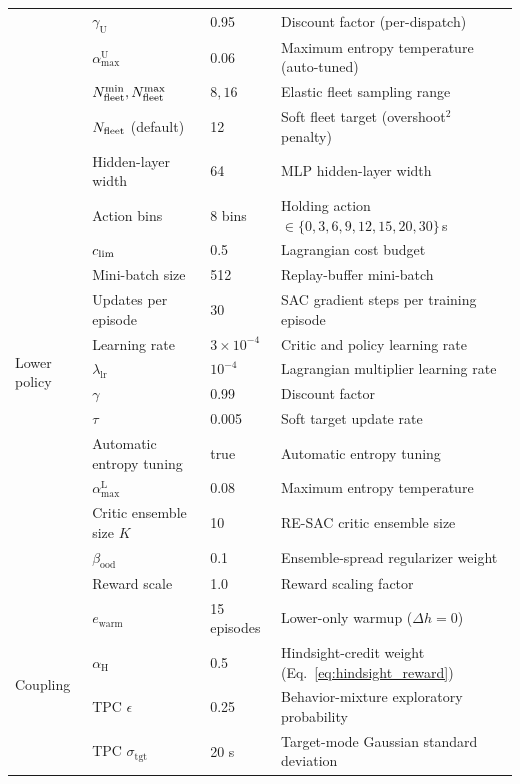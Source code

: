 \begin{table}[H]
\begin{tabular}{@{}p{}p{}p{}p{}@{}}
  & $\gamma_{\mathrm U}$           & 0.95   & Discount factor (per-dispatch) \\
  & $\alpha_{\max}^{\mathrm U}$    & 0.06   & Maximum entropy temperature (auto-tuned) \\
  & $N_{\mathrm{fleet}}^{\min},N_{\mathrm{fleet}}^{\max}$ & $8, 16$ & Elastic fleet sampling range \\
  & $N_{\mathrm{fleet}}$ (default)    & 12             & Soft fleet target (overshoot$^2$ penalty) \\
\midrule
\multirow{14}{*}{Lower policy}
  & Hidden-layer width     & 64      & MLP hidden-layer width \\
  & Action bins    & 8 bins  & Holding action $\in \{0,3,6,9,12,15,20,30\}$\,s \\
  & $c_{\mathrm{lim}}$                & 0.5     & Lagrangian cost budget \\
  & Mini-batch size     & 512     & Replay-buffer mini-batch \\
  & Updates per episode & 30 & SAC gradient steps per training episode \\
  & Learning rate              & $3 \times 10^{-4}$ & Critic and policy learning rate \\
  & $\lambda_{\text{lr}}$    & $10^{-4}$ & Lagrangian multiplier learning rate \\
  & $\gamma$                 & 0.99    & Discount factor \\
  & $\tau$                   & 0.005   & Soft target update rate \\
  & Automatic entropy tuning   & true    & Automatic entropy tuning \\
  & $\alpha_{\max}^{\mathrm L}$ & 0.08  & Maximum entropy temperature \\
  & Critic ensemble size $K$ & 10   & RE-SAC critic ensemble size \\
  & $\beta_{\mathrm{ood}}$   & 0.1     & Ensemble-spread regularizer weight \\
  & Reward scale   & 1.0     & Reward scaling factor \\
\midrule
\multirow{7}{*}{Coupling}
  & $e_{\mathrm{warm}}$       & 15 episodes   & Lower-only warmup ($\Delta h = 0$) \\
  & $\alpha_{\mathrm H}$      & 0.5           & Hindsight-credit weight (Eq.~\ref{eq:hindsight_reward}) \\
  & TPC $\epsilon$            & 0.25          & Behavior-mixture exploratory probability \\
  & TPC $\sigma_{\mathrm{tgt}}$ & 20 s        & Target-mode Gaussian standard deviation \\

\end{tabular}
\end{table}
